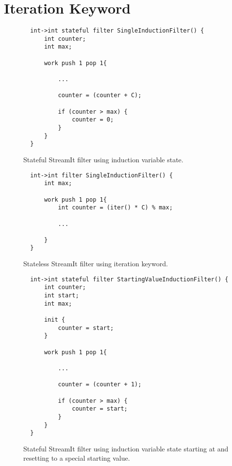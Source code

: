 \section{Iteration Keyword}

\begin{figure}[t]
{\eightpoint
\begin{verbatim}
  int->int stateful filter SingleInductionFilter() {
      int counter;
      int max;
  
      work push 1 pop 1{

          ...

          counter = (counter + C);

          if (counter > max) {
              counter = 0;
          } 
      }
  }
\end{verbatim}
\caption{Stateful StreamIt filter using induction variable state.\protect\label{fig:transform-before-simple}}}
\end{figure}

\begin{figure}[t]
{\eightpoint
\begin{verbatim}
  int->int filter SingleInductionFilter() {
      int max;
  
      work push 1 pop 1{
          int counter = (iter() * C) % max;

          ...

      }
  }
\end{verbatim}
\caption{Stateless StreamIt filter using iteration keyword.\protect\label{fig:transform-after-simple}}}
\end{figure}


\begin{figure}[t]
{\eightpoint
\begin{verbatim}
  int->int stateful filter StartingValueInductionFilter() {
      int counter;
      int start;
      int max;

      init {
          counter = start;
      }
  
      work push 1 pop 1{

          ...

          counter = (counter + 1);

          if (counter > max) {
              counter = start;
          } 
      }
  }
\end{verbatim}
\caption{Stateful StreamIt filter using induction variable state starting at and resetting to a special starting value.\protect\label{fig:transform-before-starting}}}
\end{figure}

